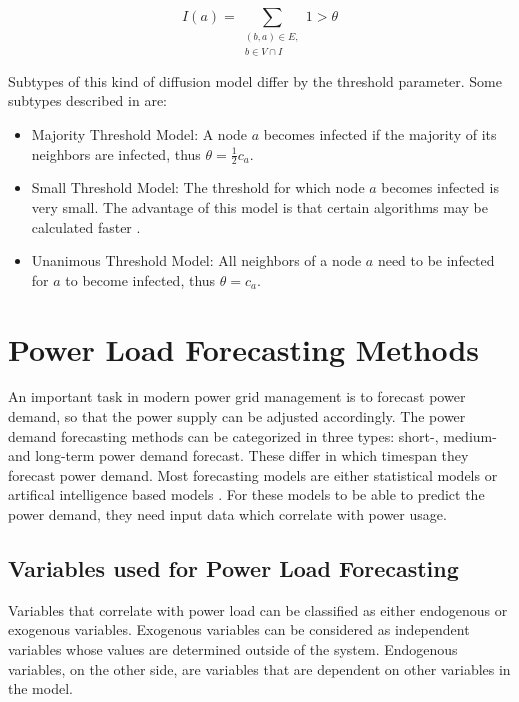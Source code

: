 \begin{equation}
    I(a) = \sum\limits_{\substack{(b,a)\in E, \\ b \in V \cap I}}
    1 > \theta    
    \label{eq:threshold}
\end{equation}

Subtypes of this kind of diffusion model differ by the threshold parameter.
Some subtypes described in \cite{diffusionbasics} are:

\begin{itemize}
    \item Majority Threshold Model: A node $a$ becomes
    infected if the majority of its neighbors are infected, thus 
    $\theta = \frac{1}{2}c_a$.
    \item Small Threshold Model: The threshold for which
    node $a$ becomes infected is very small. The advantage of this model is that 
    certain algorithms may be calculated faster \cite{diffusionbasics}.
    \item Unanimous Threshold Model: All neighbors 
    of a node $a$ need to be infected for $a$ to become infected, thus
    $\theta = c_a$.
\end{itemize}


\section{Power Load Forecasting Methods}
\label{powerloadsection}

An important task in modern power grid management 
is to forecast power demand, so that the power supply can be adjusted accordingly.
The power demand forecasting methods can be categorized in three types:
short-, medium- and long-term power demand forecast. These differ in which
timespan they forecast power demand. Most forecasting models are 
either statistical models or artifical intelligence based models 
\cite{raza2015review}. For these models to be able to predict the power 
demand, they need input data which correlate with power 
usage. 

\subsection{Variables used for Power Load Forecasting}
\label{variabledependency}
Variables that correlate with power load 
can be classified as either endogenous or exogenous variables.
Exogenous variables can be considered as independent variables 
whose values are determined outside of the system. 
Endogenous variables, on the other side, 
are variables that are dependent on other variables in the 
model.

